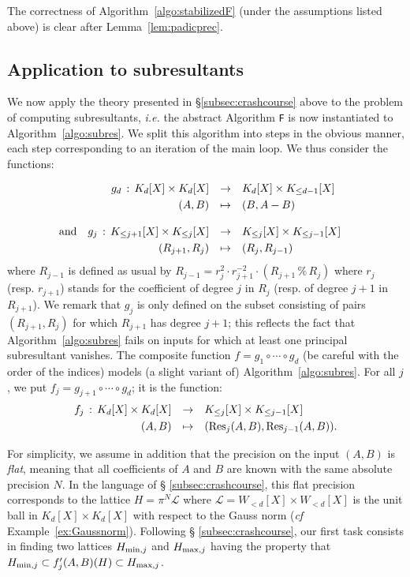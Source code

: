 \documentclass{jT}
\numberwithin{equation}{section}
\theoremstyle{definition}
\newcommand{\calL}{\mathcal L}
\renewcommand{\min}{\text{\rm min}}
\renewcommand{\max}{\text{\rm max}}
\renewcommand{\Res}{\text{\rm Res}}
\newcommand{\A}{W}
\begin{document}
The correctness of Algorithm~\ref{algo:stabilizedF} (under the 
assumptions listed above) is clear after Lemma~\ref{lem:padicprec}.

\subsection{Application to subresultants}
\label{subsec:stabilization}

We now apply the theory presented in \S \ref{subsec:crashcourse} above 
to the problem of computing subresultants, \emph{i.e.} the abstract 
Algorithm \texttt{F} is now instantiated to Algorithm~\ref{algo:subres}. 
We split this algorithm into steps in the obvious manner, each step 
corresponding to an iteration of the main loop. We thus consider the
functions:

$$\begin{array}{rrclc}
&g_d \, : \, K_d[X] \times K_d[X] &\to &K_d[X] \times K_{\leq d-1}[X] 
\smallskip \\
&(A,B) & \mapsto & (B, A-B) \bigskip \\
\text{and} &g_j \, : \, 
K_{\leq j+1}[X] \times K_{\leq j}[X]
& \to & K_{\leq j}[X] \times K_{\leq j-1}[X] \smallskip \\
&(R_{j+1}, R_j) & \mapsto & (R_j, R_{j-1})
& 
\end{array}$$
where $R_{j-1}$ is defined as usual by
$R_{j-1} = r_j^2 \cdot r_{j+1}^{-2} \cdot 
(R_{j+1} \,\%\, R_j)$
where $r_j$ (resp. $r_{j+1}$) stands for the coefficient of degree $j$ 
in $R_j$ (resp. of degree $j+1$ in $R_{j+1}$). We remark that $g_j$ is 
only defined on the subset consisting of pairs $(R_{j+1}, R_j)$ for 
which $R_{j+1}$ has degree $j+1$; this reflects the fact that 
Algorithm~\ref{algo:subres} fails on inputs for which at least one 
principal
subresultant vanishes. The composite function $f = g_1 \circ \cdots 
\circ g_d$ (be careful with the order of the indices) models (a slight 
variant of) Algorithm~\ref{algo:subres}. For all $j$, we put $f_j = 
g_{j+1} \circ \cdots \circ g_d$; it is the function:
$$\begin{array}{rcl}
f_j \, : \, K_d[X] \times K_d[X] & \to & K_{\leq j}[X] \times 
K_{\leq j-1}[X] \smallskip \\
(A,B) & \mapsto & (\Res_j(A,B), \Res_{j-1}(A,B)).
\end{array}$$

For simplicity, we assume in addition that the precision on the input 
$(A,B)$ is \emph{flat}, meaning that all coefficients of $A$ and $B$ are 
known with the same absolute precision $N$. In the language of \S 
\ref{subsec:crashcourse}, this flat precision corresponds to the lattice 
$H = \pi^N \calL$ where $\calL = \A_{<d}[X] \times \A_{<d}[X]$ is the 
unit ball in $K_d[X] \times K_d[X]$ with respect to the Gauss norm
(\emph{cf} Example~\ref{ex:Gaussnorm}). Following \S 
\ref{subsec:crashcourse}, our first task consists in finding two 
lattices $H_{\min,j}$ and $H_{\max,j}$ having the property that 
$H_{\min,j} \subset f'_j(A,B)(H) \subset H_{\max,j}$.
\end{document}
